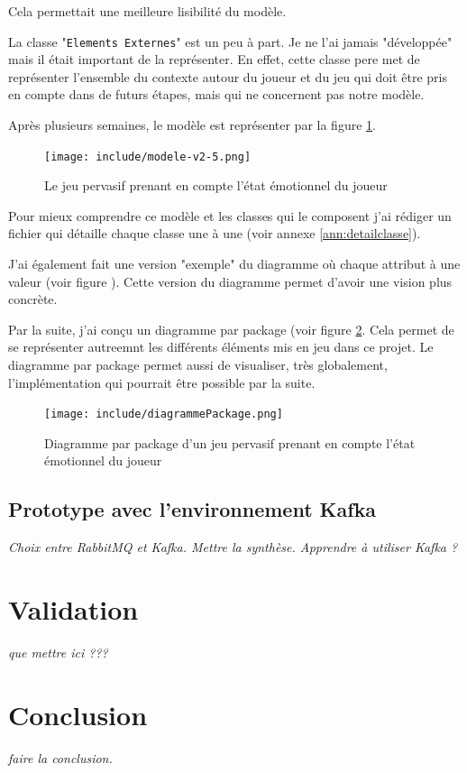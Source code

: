 \documentclass{article}
\begin{document}
		Cela permettait une meilleure lisibilité du modèle.\par
		La classe  "\texttt{Elements Externes}" est un peu à part. Je ne l'ai jamais "développée" mais il était important de la représenter.
		En effet, cette classe pere	met de représenter l'ensemble du contexte autour du joueur et du jeu qui doit être pris en compte dans de futurs étapes, mais qui ne concernent pas notre modèle.\par
		Après plusieurs semaines, le modèle est représenter par la figure \ref{fig:modele}.
		\begin{figure}
			\texttt{[image: include/modele-v2-5.png]}
			\caption{Le jeu pervasif prenant en compte l'état émotionnel du joueur}
			\label{fig:modele}
		\end{figure}
		Pour mieux comprendre ce modèle et les classes qui le composent j'ai rédiger un fichier qui détaille chaque classe une à une (voir annexe \ref{ann:detailclasse}).\par
		J'ai également fait une version "exemple" du diagramme où chaque attribut à une valeur (voir figure %
		). 
		Cette version du diagramme permet d'avoir une vision plus concrète.\par
		Par la suite, j'ai conçu un diagramme par package (voir figure \ref{fig:diagpack}.
		Cela permet de se représenter autreemnt les différents éléments mis en jeu dans ce projet.
		Le diagramme par package permet aussi de visualiser, très globalement, l'implémentation qui pourrait être possible par la suite.
		\begin{figure}
			\centering
			\texttt{[image: include/diagrammePackage.png]}
			\caption{Diagramme par package d'un jeu pervasif prenant en compte l'état émotionnel du joueur}
			\label{fig:diagpack}
		\end{figure}
	\subsection{Prototype avec l'environnement Kafka}
		\textit{Choix entre RabbitMQ et Kafka.\newline
		Mettre la synthèse.\newline
		Apprendre à utiliser Kafka ?}

\section{Validation}
	\textit{que mettre ici ???}

\section{Conclusion}
	\textit{faire la conclusion.}
\end{document}
